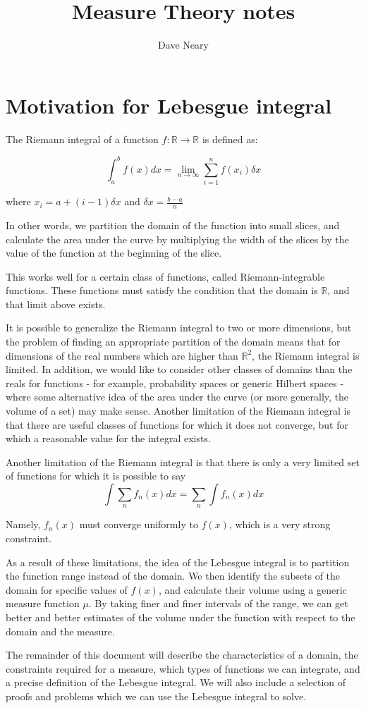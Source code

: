 \documentclass{article}
\begin{document}
\title{Measure Theory notes}
\author{Dave Neary}

\maketitle

\section{Motivation for Lebesgue integral}

The Riemann integral of a function $f:\mathbb{R} \rightarrow \mathbb{R}$ is defined as:

\[ \int_{a}^{b}f(x) dx = \lim_{n \rightarrow \infty}\sum_{i=1}^{n}f(x_{i}) \delta x \]
 
where $x_{i} = a + (i-1)\delta x$ and $\delta x=\frac{b-a}{n}$

In other words, we partition the domain of the function into small slices, 
and calculate the area under the curve by multiplying the width of the slices 
by the value of the function at the beginning of the slice.

This works well for a certain class of functions, called Riemann-integrable
functions. These functions must satisfy the condition that the domain is $\mathbb{R}$,
and that limit above exists.

It is possible to generalize the Riemann integral to two
or more dimensions, but the problem of finding an appropriate partition of the domain
means that for dimensions of the real numbers which are higher than $\mathbb{R}^2$,
the Riemann integral is limited.  In addition, we would like to consider other classes
of domains than the reals for functions - for example, probability spaces or generic
Hilbert spaces - where some alternative idea of the area under the curve (or more 
generally, the volume of a set) may make sense. Another limitation of the Riemann
integral is that there are useful classes of functions for which it does not converge,
but for which a reasonable value for the integral exists.
 
Another limitation of the Riemann integral is that there is only a very limited set of
functions for which  it is possible to say 
\[\int \sum_n f_n(x) dx = \sum_n \int f_n(x) dx \]

Namely, $f_n(x)$ must converge uniformly to $f(x)$, which is a very strong constraint.

As a result of these limitations, the idea of the Lebesgue integral is to partition
the function range instead of the domain. We then identify the subsets of the domain for
specific values of $f(x)$, and calculate their volume using a generic measure function
$\mu$. By taking finer and finer intervals of the range, we can get better and better 
estimates of the volume under the function with respect to the domain and the measure.

The remainder of this document will describe the characteristics of a domain, the
constraints required for a measure, which types of functions we can integrate, and
a precise definition of the Lebesgue integral. We will also include a selection of
proofs and problems which we can use the Lebesgue integral to solve.
\end{document}
